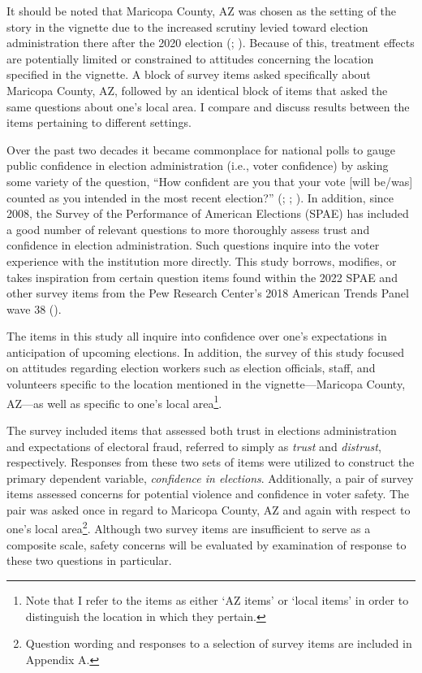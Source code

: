 \documentclass[
  12pt,
  letterpaper,
]{article}
\begin{document}
It should be noted that Maricopa County, AZ was chosen as the setting of
the story in the vignette due to the increased scrutiny levied toward
election administration there after the 2020 election
(;
). Because of this, treatment effects are
potentially limited or constrained to attitudes concerning the location
specified in the vignette. A block of survey items asked specifically
about Maricopa County, AZ, followed by an identical block of items that
asked the same questions about one's local area. I compare and discuss
results between the items pertaining to different settings.

Over the past two decades it became commonplace for national polls to
gauge public confidence in election administration (i.e., voter
confidence) by asking some variety of the question, ``How confident are
you that your vote {[}will be/was{]} counted as you intended in the most
recent election?'' (; ;
). In addition, since 2008, the
Survey of the Performance of American Elections (SPAE) has included a
good number of relevant questions to more thoroughly assess trust and
confidence in election administration. Such questions inquire into the
voter experience with the institution more directly. This study borrows,
modifies, or takes inspiration from certain question items found within
the 2022 SPAE and other survey items from the Pew Research Center's 2018
American Trends Panel wave 38 ().

The items in this study all inquire into confidence over one's
expectations in anticipation of upcoming elections. In addition, the
survey of this study focused on attitudes regarding election workers
such as election officials, staff, and volunteers specific to the
location mentioned in the vignette---Maricopa County, AZ---as well as
specific to one's local area\footnote{Note that I refer to the items as
  either `AZ items' or `local items' in order to distinguish the
  location in which they pertain.}.

The survey included items that assessed both trust in elections
administration and expectations of electoral fraud, referred to simply
as \emph{trust} and \emph{distrust}, respectively. Responses from these
two sets of items were utilized to construct the primary dependent
variable, \emph{confidence in elections}. Additionally, a pair of survey
items assessed concerns for potential violence and confidence in voter
safety. The pair was asked once in regard to Maricopa County, AZ and
again with respect to one's local area\footnote{Question wording and
  responses to a selection of survey items are included in Appendix A.}.
Although two survey items are insufficient to serve as a composite
scale, safety concerns will be evaluated by examination of response to
these two questions in particular.
\end{document}
